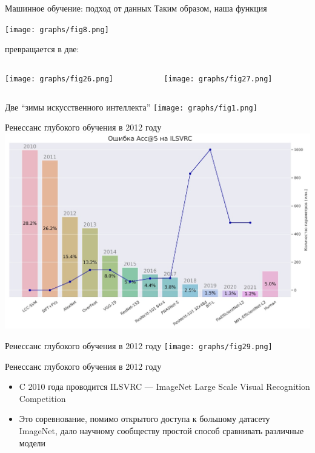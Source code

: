 \documentclass[aspectratio=169]{beamer}
\begin{document}
\begin{frame}{Машинное обучение: подход от данных}
    Таким образом, наша функция
    \begin{center}
        \texttt{[image: graphs/fig8.png]}
    \end{center}
    \pause{}
    превращается в две:
    \hfill
    \begin{columns}
        \begin{column}{0.4\linewidth}
            \texttt{[image: graphs/fig26.png]}
        \end{column}
        \begin{column}{0.4\linewidth}
            \texttt{[image: graphs/fig27.png]}
        \end{column}
    \end{columns}
\end{frame}

\begin{frame}{Две ``зимы искусственного интеллекта''}
    \texttt{[image: graphs/fig1.png]}
\end{frame}

\begin{frame}{Ренессанс глубокого обучения в 2012 году}
    \pause{}
    \includegraphics[width=\linewidth]{graphs/fig28.jpg}
\end{frame}

\begin{frame}{Ренессанс глубокого обучения в 2012 году}
    \texttt{[image: graphs/fig29.png]}
\end{frame}

\begin{frame}{Ренессанс глубокого обучения в 2012 году}
    \begin{itemize}
        \item C 2010 года проводится ILSVRC --- ImageNet Large Scale Visual
         Recognition Competition
        \item Это соревнование, помимо открытого доступа к большому датасету
         ImageNet, дало научному сообществу простой способ сравнивать
         различные модели
    \end{itemize}
\end{frame}
\end{document}
